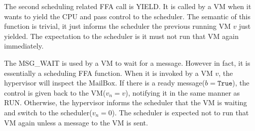 \documentclass[a4paper]{article}
\newcommand*{\MB}{\text{MailBox}}
\newcommand*{\YIELD}{\text{YIELD}}
\newcommand*{\instr}[1]{\texttt{#1}}
\begin{document}
The second scheduling related FFA call is YIELD. It is called by a VM when it
wants to yield the CPU and pass control to the scheduler. The semantic of this
function is trivial, it just informs the scheduler the previous running VM $v$
just yielded. The expectation to the scheduler is it must not run that VM again
immediately.


The MSG\_WAIT is used by a VM to wait for a message. However in fact, it is
essentially a scheduling FFA function. When it is invoked by a VM $v$, the
hypervisor will inspect the $\MB$. If there is a ready
message($b=\mathtt{True}$), the control is given back to the VM($v_{n}=v$),
notifying it in the same manner as RUN. Otherwise, the hypervisor informs the
scheduler that the VM is waiting and switch to the scheduler($v_{n}=0$). The
scheduler is expected not to run that VM again unless a message to the VM is
sent.



\end{document}
